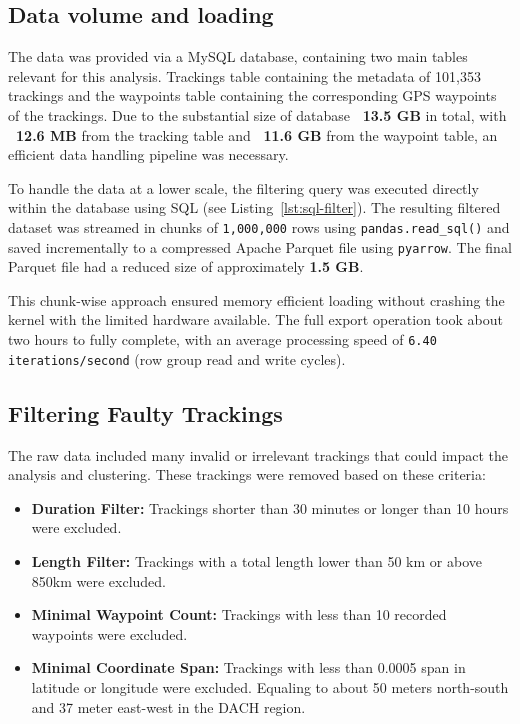 \documentclass[a4paper,12pt,twoside]{scrreprt}
\begin{document}
\subsection{Data volume and loading}

The data was provided via a MySQL database, containing two main tables relevant
for this analysis.
Trackings table containing the metadata of 101,353 trackings and the waypoints
table containing the corresponding GPS waypoints of the trackings.
Due to the substantial size of database \textbf{~13.5 GB} in total, with
\textbf{~12.6 MB} from the tracking table and \textbf{~11.6 GB} from the
waypoint table,
an efficient data handling pipeline was necessary.

To handle the data at a lower scale, the filtering query was executed directly
within the database using SQL (see Listing~\ref{lst:sql-filter}). The resulting
filtered dataset was streamed in chunks of \texttt{1,000,000} rows using
\texttt{pandas.read\_sql()} and saved incrementally to a compressed Apache
Parquet file using \texttt{pyarrow}. The final Parquet file had a reduced size
of approximately \textbf{1.5 GB}.

This chunk-wise approach ensured memory efficient loading without crashing the
kernel with the limited hardware available.
The full export operation took about two hours to fully complete, with an
average processing speed of \texttt{6.40 iterations/second} (row group read and
write cycles).

\subsection{Filtering Faulty Trackings}
The raw data included many invalid or irrelevant trackings that could impact
the analysis and clustering. These trackings were removed based on these
criteria:

\begin{itemize}
  \item \textbf{Duration Filter:} Trackings shorter than 30 minutes or longer
        than 10 hours were excluded.
  \item \textbf{Length Filter:} Trackings with a total length lower than 50 km
        or above 850km were excluded.
  \item \textbf{Minimal Waypoint Count:} Trackings with less than 10 recorded
        waypoints were excluded.
  \item \textbf{Minimal Coordinate Span:} Trackings with less than 0.0005 span
        in latitude or longitude were excluded. Equaling to about 50 meters
        north-south
        and 37 meter east-west in the DACH region.
\end{itemize}
\end{document}
